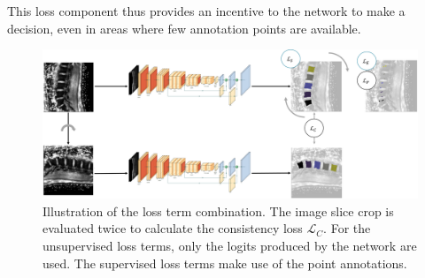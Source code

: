 This loss component thus provides an incentive to the network to make a decision, even in areas where few annotation points are available.

\begin{figure}
\centering
    \includegraphics[width=.95\textwidth]{images/Loss_combination.png}
    \caption{Illustration of the loss term combination. The image slice crop is evaluated twice to calculate the consistency loss $\mathcal{L}_C$. For the unsupervised loss terms, only the logits produced by the network are used.
    The supervised loss terms make use of the point annotations.}
\end{figure}